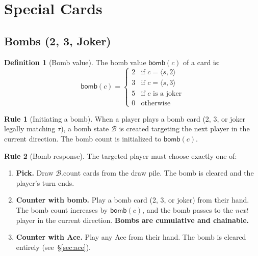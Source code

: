 \documentclass[11pt,a4paper,twoside]{article}
\theoremstyle{definition}
\newtheorem{definition}{Definition}[section]
\newtheorem{rule}{Rule}[section]
\theoremstyle{remark}
\newcommand{\Card}[2]{\ensuremath{\langle #1, #2 \rangle}}
\newcommand{\Top}{\ensuremath{\tau}}
\newcommand{\Bomb}{\ensuremath{\mathcal{B}}}
\newcommand{\func}[1]{\ensuremath{\mathsf{#1}}}
\begin{document}
\section{Special Cards}
\label{sec:special}

\subsection{Bombs (2, 3, Joker)}
\label{sec:bomb}

\begin{definition}[Bomb value]
  The bomb value $\func{bomb}(c)$ of a card is:
  \[
  \func{bomb}(c) = \begin{cases}
    2 & \text{if } c = \Card{s}{2} \\
    3 & \text{if } c = \Card{s}{3} \\
    5 & \text{if } c \text{ is a joker} \\
    0 & \text{otherwise}
  \end{cases}
  \]
\end{definition}

\begin{rule}[Initiating a bomb]
  When a player plays a bomb card (2, 3, or joker legally matching $\Top$),
  a bomb state $\Bomb$ is created targeting the next player in the current
  direction. The bomb count is initialized to $\func{bomb}(c)$.
\end{rule}

\begin{rule}[Bomb response]
  The targeted player must choose exactly one of:
  \begin{enumerate}[nosep, label=(\alph*)]
    \item \textbf{Pick.} Draw $\Bomb.\text{count}$ cards from the draw pile.
          The bomb is cleared and the player's turn ends.
    \item \textbf{Counter with bomb.} Play a bomb card (2, 3, or joker) from
          their hand. The bomb count increases by $\func{bomb}(c)$, and the
          bomb passes to the \emph{next} player in the current direction.
          \textbf{Bombs are cumulative and chainable.}
    \item \textbf{Counter with Ace.} Play any Ace from their hand. The bomb
          is cleared entirely (see~\S\ref{sec:ace}).
  \end{enumerate}
\end{rule}
\end{document}
